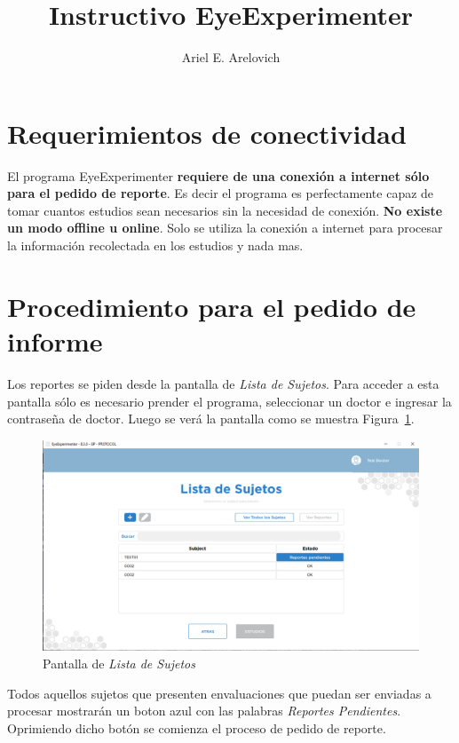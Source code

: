 \documentclass[a4paper,10pt]{article}
\title{Instructivo EyeExperimenter}
\author{Ariel E. Arelovich}
\begin{document}
\maketitle

\section{Requerimientos de conectividad}
El programa EyeExperimenter \textbf{requiere de una conexión a internet sólo para el pedido de reporte}. Es decir el programa es perfectamente capaz de tomar cuantos estudios sean necesarios sin la necesidad de conexión. \textbf{No existe un modo offline u online}. Solo se utiliza la conexión a internet para procesar la información recolectada en los estudios y nada mas. 

\section{Procedimiento para el pedido de informe}

Los reportes se piden desde la pantalla de \textit{Lista de Sujetos}. Para acceder a esta pantalla sólo es necesario prender el programa, seleccionar un doctor e ingresar la contraseña de doctor. Luego se verá la pantalla como se muestra Figura~\ref{fig_lista_sujetos}.

\begin{figure}[!h]
\centering
\includegraphics[scale = 0.4]{reportes_pendientes.png}
\caption{Pantalla de \textit{Lista de Sujetos}}
\label{fig_lista_sujetos}
\end{figure}

Todos aquellos sujetos que presenten envaluaciones que puedan ser enviadas a procesar mostrarán un boton azul con las palabras \textit{Reportes Pendientes}. Oprimiendo dicho botón se comienza el proceso de pedido de reporte. 
\end{document}
